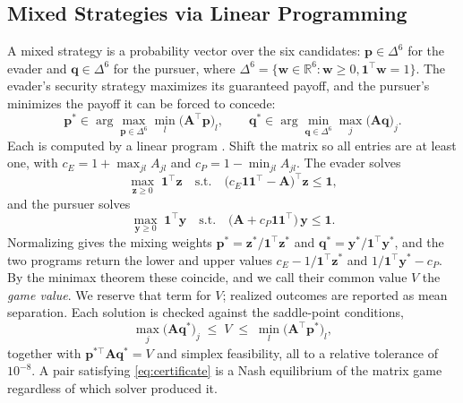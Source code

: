 
\subsection{Mixed Strategies via Linear Programming}

A mixed strategy is a probability vector over the six candidates: $\mathbf{p} \in \Delta^6$ for the evader and $\mathbf{q} \in \Delta^6$ for the pursuer, where $\Delta^6 = \{\mathbf{w} \in \mathbb{R}^6 : \mathbf{w} \geq 0, \mathbf{1}^\top \mathbf{w} = 1\}$. The evader's security strategy maximizes its guaranteed payoff, and the pursuer's minimizes the payoff it can be forced to concede:
%
\begin{equation}
    \mathbf{p}^* \in \arg\max_{\mathbf{p} \in \Delta^6} \min_{l} \big(\mathbf{A}^\top \mathbf{p}\big)_l, \qquad
    \mathbf{q}^* \in \arg\min_{\mathbf{q} \in \Delta^6} \max_{j} \big(\mathbf{A} \mathbf{q}\big)_j .
    \label{eq:security}
\end{equation}
%
Each is computed by a linear program \cite{bacsar1998dynamic}. Shift the matrix so all entries are at least one, with $c_E = 1 + \max_{jl} A_{jl}$ and $c_P = 1 - \min_{jl} A_{jl}$. The evader solves
%
\begin{equation}
    \max_{\mathbf{z} \geq 0} \; \mathbf{1}^\top \mathbf{z} \quad \text{s.t.} \quad \big(c_E \mathbf{1}\mathbf{1}^\top - \mathbf{A}\big)^\top \mathbf{z} \leq \mathbf{1},
    \label{eq:game_LP}
\end{equation}
%
and the pursuer solves
%
\begin{equation}
    \max_{\mathbf{y} \geq 0} \; \mathbf{1}^\top \mathbf{y} \quad \text{s.t.} \quad \big(\mathbf{A} + c_P \mathbf{1}\mathbf{1}^\top\big)\, \mathbf{y} \leq \mathbf{1} .
    \label{eq:game_LP_P}
\end{equation}
%
Normalizing gives the mixing weights $\mathbf{p}^* = \mathbf{z}^*/\mathbf{1}^\top\mathbf{z}^*$ and $\mathbf{q}^* = \mathbf{y}^*/\mathbf{1}^\top\mathbf{y}^*$, and the two programs return the lower and upper values $c_E - 1/\mathbf{1}^\top\mathbf{z}^*$ and $1/\mathbf{1}^\top\mathbf{y}^* - c_P$. By the minimax theorem these coincide, and we call their common value $V$ the \emph{game value}. We reserve that term for $V$; realized outcomes are reported as mean separation. Each solution is checked against the saddle-point conditions,
%
\begin{equation}
    \max_j \big(\mathbf{A}\mathbf{q}^*\big)_j \;\leq\; V \;\leq\; \min_l \big(\mathbf{A}^\top \mathbf{p}^*\big)_l ,
    \label{eq:certificate}
\end{equation}
%
together with $\mathbf{p}^{*\top}\mathbf{A}\mathbf{q}^* = V$ and simplex feasibility, all to a relative tolerance of $10^{-8}$. A pair satisfying \eqref{eq:certificate} is a Nash equilibrium of the matrix game regardless of which solver produced it.

